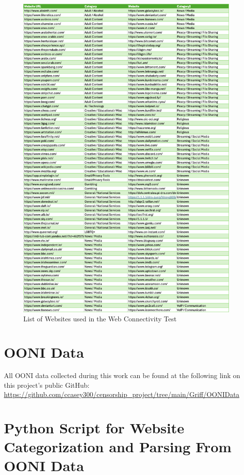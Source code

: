 \begin{figure}[H]
    \centering
    \includegraphics[width=\textwidth]{Griff/TCD SCSS CAPSTONE/appendix/Websites.png}
    \caption{List of Websites used in the Web Connectivity Test}
    \label{fig:iraq-middlebox-HTTP-manipulation}
\end{figure}

\section{OONI Data}

All OONI data collected during this work can be found at the following link on this project's public GitHub:
\url{https://github.com/ccasey300/censorship_project/tree/main/Griff/OONIData}

\section{Python Script for Website Categorization and Parsing From OONI Data}


